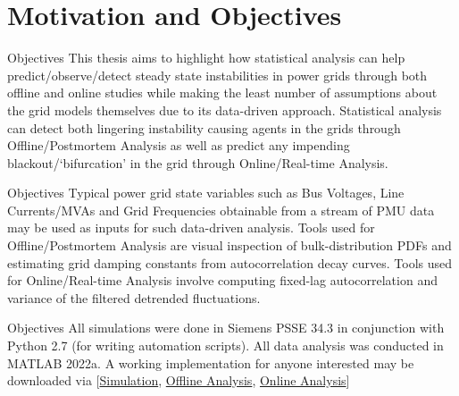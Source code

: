 \section[Motivation and Objectives]{Motivation and Objectives}
\label{sec:obj}

\begin{frame}{Objectives}
	This thesis aims to highlight how statistical analysis can help predict/observe/detect steady state instabilities in power grids through both offline and online studies while making the least number of assumptions about the grid models themselves due to its data-driven approach. Statistical analysis can detect both lingering instability causing agents in the grids through Offline/Postmortem Analysis as well as predict any impending blackout/`bifurcation' in the grid through Online/Real-time Analysis.
\end{frame}

\begin{frame}{Objectives}
	 Typical power grid state variables such as Bus Voltages, Line Currents/MVAs and Grid Frequencies obtainable from a stream of PMU data may be used as inputs for such data-driven analysis. Tools used for Offline/Postmortem Analysis are visual inspection of bulk-distribution PDFs and estimating grid damping constants from autocorrelation decay curves. Tools used for Online/Real-time Analysis involve computing fixed-lag autocorrelation and variance of the filtered detrended fluctuations.
\end{frame}

\begin{frame}{Objectives}
	All simulations were done in Siemens PSSE 34.3 in conjunction with Python 2.7 (for writing automation scripts). All data analysis was conducted in MATLAB 2022a. A working implementation for anyone interested may be downloaded via [\href{https://t.ly/HwAT}{Simulation}, \href{https://t.ly/e1f9}{Offline Analysis}, \href{https://t.ly/u_Mp}{Online Analysis}]
\end{frame}

